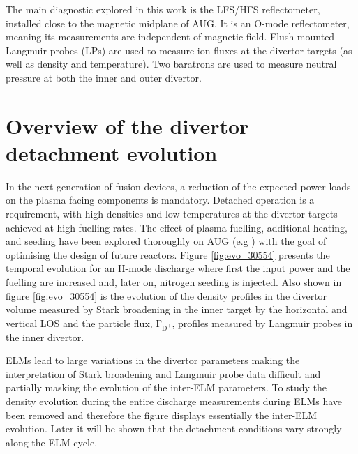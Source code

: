 \documentclass[12pt]{iopart}
\begin{document}
The main diagnostic explored in this work is the LFS/HFS reflectometer\cite{Silva1996}, installed close to the magnetic midplane of AUG. It is an O-mode reflectometer, meaning its measurements are independent of magnetic field. %
Flush mounted Langmuir probes (LPs)\cite{weinlich1996flush} are used to measure ion fluxes at the divertor targets (as well as density and temperature). Two baratrons are used to measure neutral pressure at both the inner and outer divertor. 

\section{Overview of the divertor detachment evolution}
\label{section:overviewdivdetevol}

In the next generation of fusion devices, a reduction of the expected power loads on the plasma facing components is mandatory. Detached operation is a requirement, with high densities and low temperatures at the divertor targets achieved at high fuelling rates. The effect of plasma fuelling, additional heating, and seeding have been explored thoroughly on AUG (e.g \cite{kallenbach2018parameter,Potzel2015a,Bernert2013a}) with the goal of optimising the design of future reactors. Figure \ref{fig:evo_30554} presents the temporal evolution for an H-mode discharge where first the input power and the fuelling are increased and, later on, nitrogen seeding is injected. Also shown in figure \ref{fig:evo_30554} is the evolution of the density profiles in the divertor volume measured by Stark broadening in the inner target by the horizontal and vertical LOS and the particle flux, $\mathrm{\Gamma_{D^{+}}}$, profiles measured by Langmuir probes in the inner divertor.

ELMs lead to large variations in the divertor parameters making the interpretation of Stark broadening and Langmuir probe data difficult and partially masking the evolution of the inter-ELM parameters. To study the density evolution during the entire discharge measurements during ELMs have been removed and therefore the figure displays essentially the inter-ELM evolution. Later it will be shown that the detachment conditions vary strongly along the ELM cycle.
\end{document}
